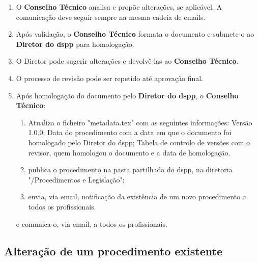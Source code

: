 \begin{enumerate}
  \item O \textbf{Conselho Técnico} analisa e propõe alterações, se aplicável. A comunicação deve seguir sempre na mesma cadeia de emails.
  \item Após validação, o \textbf{Conselho Técnico} formata o documento e submete-o ao \textbf{Diretor do \gls{dspp}} para homologação.
  \item O Diretor pode sugerir alterações e devolvê-las ao \textbf{Conselho Técnico}.
  \item O processo de revisão pode ser repetido até aprovação final.
  \item Após homologação do documento pelo \textbf{Diretor do \gls{dspp}}, o \textbf{Conselho Técnico}:
  \begin{enumerate}
    \item Atualiza o ficheiro "metadata.tex" com as seguintes informações: Versão 1.0.0; Data do procedimento com a data em que o documento foi homologado pelo Diretor do \gls{dspp}; Tabela de controlo de versões com o revisor, quem homologou o documento e a data de homologação.
    \item publica o procedimento na pasta partilhada do \gls{dspp}, na diretoria "/Procedimentos e Legislação";
    \item envia, via email, notificação da existência de um novo procedimento a todos os profissionais.
  \end{enumerate}
  
   e comunica-o, via email, a todos os profissionais.
\end{enumerate}

\subsection{Alteração de um procedimento existente}

